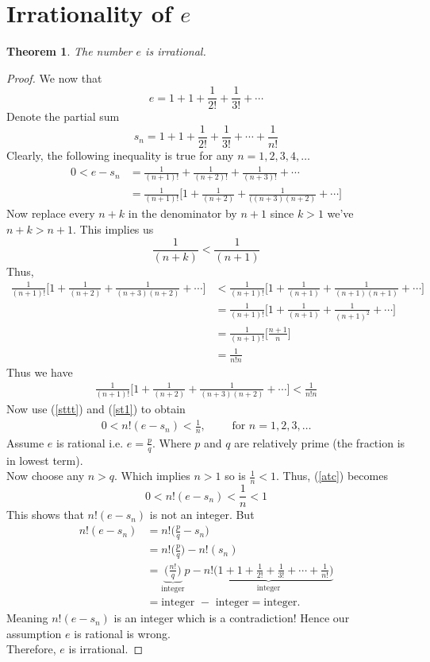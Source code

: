\documentclass[12pt]{article}
\newtheorem{thm}{Theorem}[section]
\begin{document}
\section{Irrationality of $e$}
\begin{thm} The number $e$ is irrational.
\end{thm}
\begin{proof}
We now that
\[e=1+1+\frac{1}{2!}+\frac{1}{3!}+\cdots\]
Denote the partial sum
\[s_n=1+1+\frac{1}{2!}+\frac{1}{3!}+\cdots+\frac{1}{n!}\]
Clearly, the following inequality is true for any $n=1,2,3,4,\ldots$
\begin{align}
0<e-s_n &= \frac{1}{(n+1)!}+\frac{1}{(n+2)!}+\frac{1}{(n+3)!}+\cdots\\
        &= \frac{1}{(n+1)!}\biggl[1+\frac{1}{(n+2)}+\frac{1}{((n+3)(n+2)}+\cdots\biggl]     \label{st1}
\end{align}
Now replace every $n+k$ in the denominator by $n+1$  since $k>1$ we've $n+k>n+1$.
This implies us
\[\frac{1}{(n+k)}<\frac{1}{(n+1)}\]
Thus,
\begin{align*}
\frac{1}{(n+1)!} \biggl[1+\frac{1}{(n+2)} + \frac{1}{(n+3)(n+2)}+\cdots\biggl]&<\frac{1}{(n+1)!}\biggl[1+\frac{1}{(n+1)}+\frac{1}{(n+1)(n+1)}+\cdots\biggl]   \\
                                  &=\frac{1}{(n+1)!}\biggl[1+\frac{1}{(n+1)}+\frac{1}{(n+1)^2}+\cdots\biggl] \\
                                  &=\frac{1}{(n+1)!}\biggl[\frac{n+1}{n}\biggl]\tag{Geometric sum}\\
                                  &=\frac{1}{n!n}
\end{align*}
Thus we have
\begin{align}\label{sttt}
\frac{1}{(n+1)!} \biggl[1+\frac{1}{(n+2)} + \frac{1}{(n+3)(n+2)}+\cdots\biggl]<\frac{1}{n!n}
\end{align}
Now use (\ref{sttt}) and (\ref{st1}) to obtain
\begin{align}\label{atc}
0<n!(e-s_n )<\frac{1}{n},\qquad  \text{ for } n =1,2,3,\ldots
\end{align}
Assume $e$ is rational i.e.  $e=\frac{p}{q}$.  Where $p$ and $q$ are relatively prime (the fraction is in lowest term).\\
Now choose any $n>q$. Which implies $n>1$ so is  $\frac{1}{n}<1$.
Thus, (\ref{atc}) becomes
\[
0<n!(e-s_n )<\frac{1}{n}<1
\]
This shows that  $n!(e-s_n )$  is not an integer. But
\begin{align*}
n!(e-s_n )&=n!\biggl(\frac{p}{q}-s_n\biggl)\\
          &=n!\biggl(\frac{p}{q}\biggl)-n!(s_n)\\
          &=\underbrace{\biggl(\frac{n!}{q}\biggl)}_{\text{integer}}p-\underbrace{n!\biggl(1+1+\frac{1}{2!}+\frac{1}{3!}+
          \cdots+\frac{1}{n!}\biggl)}_{\text{integer}}
          \tag{$q|n!\because n>q$.}\\
          &= \text{integer }-\text{ integer}=\text{integer}.
\end{align*}
Meaning $n!(e-s_n )$  is an integer which is a contradiction! Hence our assumption $e$ is rational is wrong.\\
Therefore, $e$ is irrational.
\end{proof}
\end{document}
